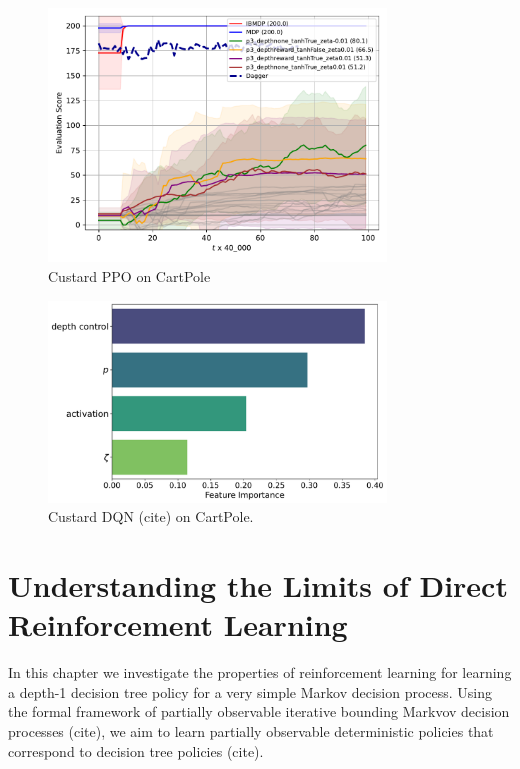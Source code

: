 \begin{figure}
    \centering
    \includegraphics[width=0.8\textwidth]{images/images_part1/ppo.pdf}
    \caption{Custard PPO on CartPole}
\end{figure}

\begin{figure}
    \centering
    \includegraphics[width=0.8\textwidth]{images/images_part1/hyperparameter_importance_ppo.pdf}
    \caption{Custard DQN (cite) on CartPole.}
\end{figure}



\chapter{Understanding the Limits of Direct Reinforcement Learning}
In this chapter we investigate the properties of reinforcement learning for learning a depth-1 decision tree policy for a very simple Markov decision process.
Using the formal framework of partially observable iterative bounding Markvov decision processes (cite), we aim to learn partially observable deterministic policies that correspond to decision tree policies (cite).

